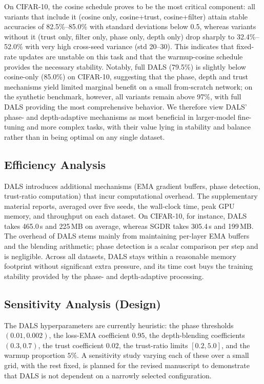 \documentclass[a4paper,fleqn]{cas-dc}
\begin{document}
On CIFAR-10, the cosine schedule proves to be the most critical component: all variants that include it (cosine only, cosine+trust, cosine+filter) attain stable accuracies of 82.5\%--85.0\% with standard deviations below 0.5, whereas variants without it (trust only, filter only, phase only, depth only) drop sharply to 32.4\%--52.0\% with very high cross-seed variance (std 20--30). This indicates that fixed-rate updates are unstable on this task and that the warmup-cosine schedule provides the necessary stability. Notably, full DALS (79.5\%) is slightly below cosine-only (85.0\%) on CIFAR-10, suggesting that the phase, depth and trust mechanisms yield limited marginal benefit on a small from-scratch network; on the synthetic benchmark, however, all variants remain above 97\%, with full DALS providing the most comprehensive behavior. We therefore view DALS' phase- and depth-adaptive mechanisms as most beneficial in larger-model fine-tuning and more complex tasks, with their value lying in stability and balance rather than in being optimal on any single dataset.

\subsection{Efficiency Analysis}\label{sec:efficiency}

DALS introduces additional mechanisms (EMA gradient buffers, phase detection, trust-ratio computation) that incur computational overhead. The supplementary material reports, averaged over five seeds, the wall-clock time, peak GPU memory, and throughput on each dataset. On CIFAR-10, for instance, DALS takes 465.0\,s and 225\,MB on average, whereas SGDR takes 305.4\,s and 199\,MB. The overhead of DALS stems mainly from maintaining per-layer EMA buffers and the blending arithmetic; phase detection is a scalar comparison per step and is negligible. Across all datasets, DALS stays within a reasonable memory footprint without significant extra pressure, and its time cost buys the training stability provided by the phase- and depth-adaptive processing.

\subsection{Sensitivity Analysis (Design)}\label{sec:sensitivity}

The DALS hyperparameters are currently heuristic: the phase thresholds $(0.01,0.002)$, the loss-EMA coefficient $0.95$, the depth-blending coefficients $(0.3,0.7)$, the trust coefficient $0.02$, the trust-ratio limits $[0.2,5.0]$, and the warmup proportion $5\%$. A sensitivity study varying each of these over a small grid, with the rest fixed, is planned for the revised manuscript to demonstrate that DALS is not dependent on a narrowly selected configuration.
\end{document}
